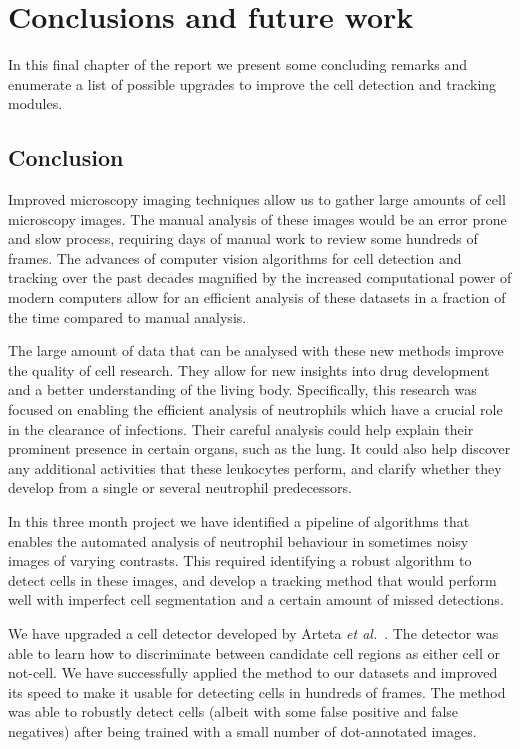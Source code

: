 		
\chapter{Conclusions and future work}
\label{chap:conclusion}

In this final chapter of the report we present some concluding remarks and enumerate a list of possible upgrades to improve the cell detection and tracking modules.

\section{Conclusion}
\label{sec:conclusion_conclusion}

Improved microscopy imaging techniques allow us to gather large amounts of cell microscopy images. The manual analysis of these images would be an error prone and slow process, requiring days of manual work to review some hundreds of frames. The advances of computer vision algorithms for cell detection and tracking over the past decades magnified by the increased computational power of modern computers allow for an efficient analysis of these datasets in a fraction of the time compared to manual analysis.

The large amount of data that can be analysed with these new methods improve the quality of cell research. They allow for new insights into drug development and a better understanding of the living body. Specifically, this research was focused on enabling the efficient analysis of neutrophils which have a crucial role in the clearance of infections. Their careful analysis could help explain their prominent presence in certain organs, such as the lung. It could also help discover any additional activities that these leukocytes perform, and clarify whether they develop from a single or several neutrophil predecessors.

In this three month project we have identified a pipeline of algorithms that enables the automated analysis of neutrophil behaviour in sometimes noisy images of varying contrasts. This required identifying a robust algorithm to detect cells in these images, and develop a tracking method that would perform well with imperfect cell segmentation and a certain amount of missed detections.

We have upgraded a cell detector developed by Arteta \emph{et al.}~\cite{arteta12}. The detector was able to learn how to discriminate between candidate cell regions as either cell or not-cell. We have successfully applied the method to our datasets and improved its speed to make it usable for detecting cells in hundreds of frames. The method was able to robustly detect cells (albeit with some false positive and false negatives) after being trained with a small number of dot-annotated images.

